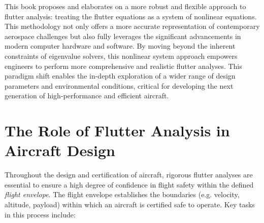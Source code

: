\documentclass[10pt,openany,twoside]{book}
\numberwithin{equation}{section}   %
\newcommand{\Newterm}[1]{{\em #1}}
\begin{document}
This book proposes and elaborates on a more robust and flexible approach
to flutter analysis: treating the flutter equations as a system of
nonlinear equations. This methodology not only offers a more accurate
representation of contemporary aerospace challenges but also fully
leverages the significant advancements in modern computer hardware
and software. By moving beyond the inherent constraints of eigenvalue
solvers, this nonlinear system approach empowers engineers to perform
more comprehensive and realistic flutter analyses.  This paradigm shift
enables the in-depth exploration of a wider range of design parameters and
environmental conditions, critical for developing the next generation of
high-performance and efficient aircraft.

\section{The Role of Flutter Analysis in Aircraft Design}
Throughout the design and certification of aircraft, rigorous flutter analyses
are essential to ensure a high degree of confidence in flight safety within
the defined \Newterm{flight envelope}. The flight envelope
establishes the boundaries (e.g. velocity, altitude, payload) within which an
aircraft is certified safe to operate. Key tasks in this process include:
\end{document}
